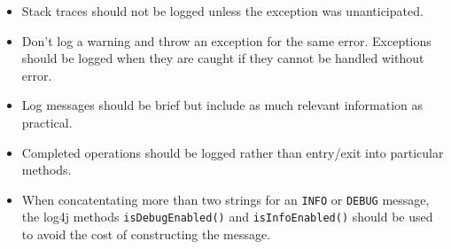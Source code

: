 \begin{itemize}
\item Stack traces should not be logged unless the exception was
unanticipated.
\item Don't log a warning and throw an exception for the same error.
Exceptions should be logged when they are caught if they cannot be 
handled without error.
\item Log messages should be brief but include as much relevant
information as practical.
\item Completed operations should be logged rather than entry/exit
into particular methods.
\item When concatentating more than two strings for an \texttt{INFO}
or \texttt{DEBUG} message, the log4j methods \texttt{isDebugEnabled()}
and \texttt{isInfoEnabled()} should be used to avoid the cost of
constructing the message.
\end{itemize}
